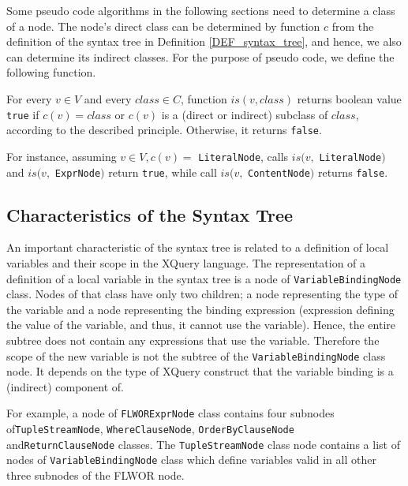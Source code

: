 Some pseudo code algorithms in the following sections need to determine a class of a node. The node's direct class can be determined by function $c$ from the definition of the syntax tree in Definition \ref{DEF_syntax_tree}, and hence, we also can determine its indirect classes. For the purpose of pseudo code, we define the following function.

\begin{define}For every $v \in V$ and every $class \in C$, function $is(v, class)$ returns boolean value \texttt{true} if $c(v) = class$ or $c(v)$ is a (direct or indirect) subclass of $class$, according to the described principle. Otherwise, it returns \texttt{false}.
\end{define}

For instance, assuming $v \in V, c(v) =$ \texttt{LiteralNode}, calls $is(v,$ \texttt{LiteralNode}$)$ and $is(v,$ \texttt{ExprNode}$)$ return \texttt{true}, while call $is(v,$ \texttt{ContentNode}$)$ returns \texttt{false}.

\subsection{Characteristics of the Syntax Tree}
An important characteristic of the syntax tree is related to a definition of local variables and their scope in the XQuery language. The representation of a definition of a local variable in the syntax tree is a node of \texttt{VariableBindingNode} class. Nodes of that class have only two children; a node representing the type of the variable and a node representing the binding expression (expression defining the value of the variable, and thus, it cannot use the variable). Hence, the entire subtree does not contain any expressions that use the variable. Therefore the scope of the new variable is not the subtree of the \texttt{VariableBindingNode} class node. It depends on the type of XQuery construct that the variable binding is a (indirect) component of.

For example, a node of \texttt{FLWORExprNode} class contains four subnodes of\linebreak \texttt{TupleStreamNode}, \texttt{WhereClauseNode}, \texttt{OrderByClauseNode} and\linebreak \texttt{ReturnClauseNode} classes. The \texttt{TupleStreamNode} class node contains a list of nodes of \texttt{VariableBindingNode} class which define variables valid in all other three subnodes of the FLWOR node.

